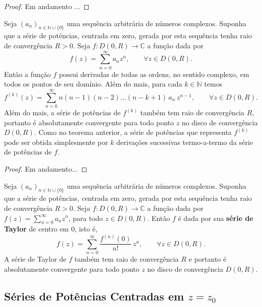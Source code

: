 \begin{proof}
{\red Em andamento ...}
\end{proof}



\begin{corolario}
\label{cor-deriva-termo-termo-serie-potencia}
Seja $(a_n)_{n\in\mathbb{N}\cup\{0\}}$ uma sequência arbitrária de números complexos.
Suponha que a série de potências, centrada em zero, gerada por esta sequência tenha raio de convergência $R>0$. 
Seja $f:D(0,R)\to\mathbb{C}$ a função dada por
\[
f(z) = \sum_{n=0}^{\infty}a_nz^n, \qquad \forall z\in D(0,R).
\]
Então a função $f$ possui derivadas de todas as ordens, no sentido complexo, em todos os 
pontos de seu domínio. Além do mais, para cada $k\in\mathbb{N}$ temos
\[
f^{(k)}(z) 
= 
\sum_{n=k}^{\infty}n(n-1)(n-2)\ldots(n-k+1) \, a_n \, z^{n-1}, \qquad\forall z\in D(0,R).
\]
Além do mais, a série de potências de $f^{(k)}$ também tem raio de convergência $R$,
portanto é absolutamente convergente para todo ponto $z$ no 
disco de convergência $D(0,R)$. Como no teorema anterior, a série de potências 
que representa $f^{(k)}$ pode ser obtida simplesmente 
por $k$ derivações sucessivas termo-a-termo da série de potências de $f$.
\end{corolario}

\begin{proof}
{\red Em andamento...}
\end{proof}


\begin{corolario}
\label{cor-serie-taylor-para-serie-pot}
Seja $(a_n)_{n\in\mathbb{N}\cup\{0\}}$ uma sequência arbitrária de números complexos.
Suponha que a série de potências, centrada em zero, gerada por esta sequência tenha raio de convergência $R>0$. 
Seja $f:D(0,R)\to\mathbb{C}$ a função dada por
$f(z) = \sum_{n=0}^{\infty}a_nz^n$, para todo $z\in D(0,R)$.
Então $f$ é dada por sua \textbf{série de Taylor} de centro em $0$, isto é,
\[
f(z) 
= 
\sum_{n=0}^{\infty}
\frac{f^{(n)}(0)}{n!} \, z^{n}, \qquad\forall z\in D(0,R).
\]
A série de Taylor de $f$ também tem raio de convergência $R$ e 
portanto é absolutamente convergente para todo ponto $z$ no 
disco de convergência $D(0,R)$.
\end{corolario}


\subsection[Séries de Potências Centradas em $z={z_0}$]
{Séries de Potências Centradas em \boldmath$z={z_0}$}
\label{subsec-series-pot-em-z0}



